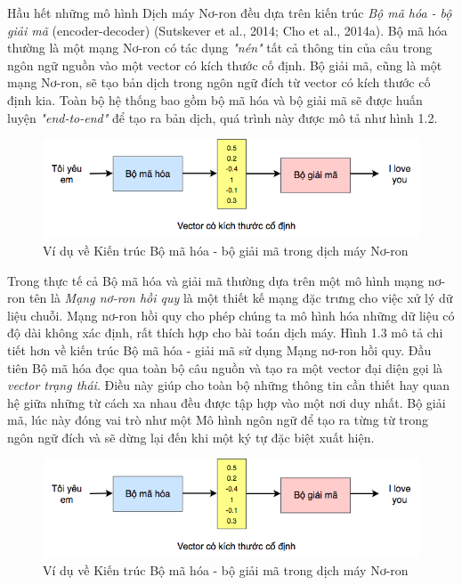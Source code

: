 Hầu hết những mô hình Dịch máy Nơ-ron đều dựa trên kiến trúc \textit{Bộ mã hóa - bộ giải mã} (encoder-decoder) (Sutskever et al., 2014; Cho et al., 2014a). Bộ mã hóa thường là một mạng Nơ-ron có tác dụng \textit{"nén"} tất cả thông tin của câu trong ngôn ngữ nguồn vào một vector có kích thước cố định. Bộ giải mã, cũng là một mạng Nơ-ron, sẽ tạo bản dịch trong ngôn ngữ đích từ vector có kích thước cố định kia. Toàn bộ hệ thống bao gồm bộ mã hóa và bộ giải mã sẽ được huấn luyện \textit{"end-to-end"} để tạo ra bản dịch, quá trình này được mô tả như hình 1.2.

\begin{figure}
	\centering
	\includegraphics[width=\textwidth]{intro2nmt}
	\caption[Ví dụ về Kiến trúc \textit{Bộ mã hóa - bộ giải mã} trong dịch máy Nơ-ron]{Ví dụ về Kiến trúc Bộ mã hóa - bộ giải mã trong dịch máy Nơ-ron}
	\label{fig_intronmt}
\end{figure}

Trong thực tế cả Bộ mã hóa và giải mã thường dựa trên một mô hình mạng nơ-ron tên là \textit{Mạng nơ-ron hồi quy} là một thiết kế mạng đặc trưng cho việc xử lý dữ liệu chuỗi. Mạng nơ-ron hồi quy cho phép chúng ta mô hình hóa những dữ liệu có độ dài không xác định, rất thích hợp cho bài toán dịch máy. Hình 1.3 mô tả chi tiết hơn về kiến trúc Bộ mã hóa - giải mã sử dụng Mạng nơ-ron hồi quy. Đầu tiên Bộ mã hóa đọc qua toàn bộ câu nguồn và tạo ra một vector đại diện gọi là \textit{vector trạng thái}. Điều này giúp cho toàn bộ những thông tin cần thiết hay quan hệ giữa những từ cách xa nhau đều được tập hợp vào một nơi duy nhất. Bộ giải mã, lúc này đóng vai trò như một Mô hình ngôn ngữ để tạo ra từng từ trong ngôn ngữ đích và sẽ dừng lại đến khi một ký tự đặc biệt xuất hiện.

\begin{figure}
	\centering
	\includegraphics[width=\textwidth]{intro2nmt}
	\caption[Ví dụ về Kiến trúc \textit{Bộ mã hóa - bộ giải mã} trong dịch máy Nơ-ron]{Ví dụ về Kiến trúc Bộ mã hóa - bộ giải mã trong dịch máy Nơ-ron}
	\label{fig_intronmt}
\end{figure}


